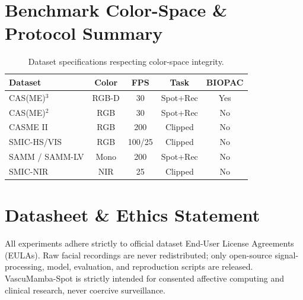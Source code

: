 \documentclass[10pt,twocolumn,letterpaper]{article}
\begin{document}
\section{Benchmark Color-Space \& Protocol Summary}
\begin{table}[h]
\centering
\caption{Dataset specifications respecting color-space integrity.}
\begin{tabular}{lcccc}
\toprule
Dataset & Color & FPS & Task & BIOPAC \\
\midrule
CAS(ME)$^3$ & RGB-D & 30 & Spot+Rec & Yes \\
CAS(ME)$^2$ & RGB & 30 & Spot+Rec & No \\
CASME II & RGB & 200 & Clipped & No \\
SMIC-HS/VIS & RGB & 100/25 & Clipped & No \\
SAMM / SAMM-LV & Mono & 200 & Spot+Rec & No \\
SMIC-NIR & NIR & 25 & Clipped & No \\
\bottomrule
\end{tabular}
\end{table}

\section{Datasheet \& Ethics Statement}
All experiments adhere strictly to official dataset End-User License Agreements (EULAs). Raw facial recordings are never redistributed; only open-source signal-processing, model, evaluation, and reproduction scripts are released. VascuMamba-Spot is strictly intended for consented affective computing and clinical research, never coercive surveillance.
\end{document}
